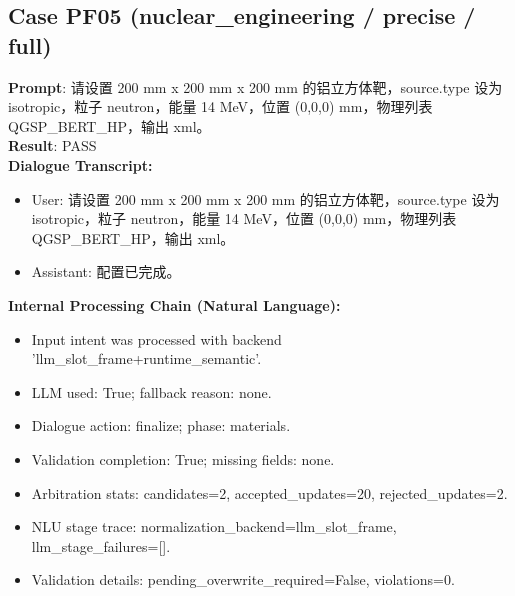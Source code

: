 \documentclass[11pt]{ctexart}
\begin{document}
\subsection{Case PF05 (nuclear\_engineering / precise / full)}
\textbf{Prompt}: 请设置 200 mm x 200 mm x 200 mm 的铝立方体靶，source.type 设为 isotropic，粒子 neutron，能量 14 MeV，位置 (0,0,0) mm，物理列表 QGSP\_BERT\_HP，输出 xml。\\
\textbf{Result}: PASS\\
\textbf{Dialogue Transcript:}
\begin{itemize}
\item User: 请设置 200 mm x 200 mm x 200 mm 的铝立方体靶，source.type 设为 isotropic，粒子 neutron，能量 14 MeV，位置 (0,0,0) mm，物理列表 QGSP\_BERT\_HP，输出 xml。
\item Assistant: 配置已完成。
\end{itemize}
\textbf{Internal Processing Chain (Natural Language):}
\begin{itemize}
\item Input intent was processed with backend 'llm\_slot\_frame+runtime\_semantic'.
\item LLM used: True; fallback reason: none.
\item Dialogue action: finalize; phase: materials.
\item Validation completion: True; missing fields: none.
\item Arbitration stats: candidates=2, accepted\_updates=20, rejected\_updates=2.
\item NLU stage trace: normalization\_backend=llm\_slot\_frame, llm\_stage\_failures=[].
\item Validation details: pending\_overwrite\_required=False, violations=0.
\end{itemize}
\end{document}
